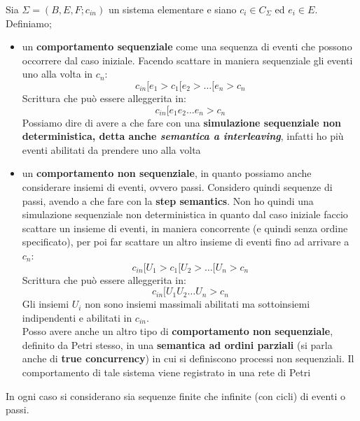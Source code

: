 \documentclass[a4paper,12pt, oneside]{book}
\begin{document}
\begin{definizione}
  Sia $\Sigma=(B,E,F;c_{in})$ un sistema elementare e siano $c_i\in C_\Sigma$ ed
  $e_i\in E$.\\
  Definiamo;
  \begin{itemize}
    \item un \textbf{comportamento sequenziale} come una sequenza di eventi che
    possono occorrere dal caso iniziale. Facendo scattare in maniera sequenziale
    gli eventi uno alla volta in $c_n$:
    \[c_{in} [e_1 > c_1 [e_2 > \ldots[e_n > c_n\]
    Scrittura che può essere alleggerita in:
    \[c_{in} [e_1 e_2 \ldots e_n > c_n\]
    Possiamo dire di avere a che fare con una \textbf{simulazione sequenziale
      non deterministica, detta anche \textit{semantica a interleaving}},
    infatti ho più eventi abilitati da prendere uno alla volta
    \item un \textbf{comportamento non sequenziale}, in quanto possiamo anche
    considerare insiemi di eventi, ovvero passi. Considero quindi sequenze di
    passi, avendo a che fare con la \textbf{step semantics}. Non ho quindi una
    simulazione sequenziale non deterministica in quanto dal caso iniziale
    faccio scattare un insieme di eventi, in maniera concorrente (e quindi senza
    ordine specificato), per poi far scattare un altro insieme di eventi fino ad
    arrivare a $c_n$: 
    \[c_{in} [U_1 > c_1 [U_2 > \ldots [U_n > c_n\]
    Scrittura che può essere alleggerita in:
    \[c_{in} [U_1 U_2 \ldots U_n > c_n\]
    Gli insiemi $U_i$ non sono insiemi massimali abilitati ma sottoinsiemi
    indipendenti e abilitati in $c_{in}$.\\
    Posso avere anche un altro tipo di \textbf{comportamento non sequenziale},
    definito da Petri stesso, in una \textbf{semantica ad ordini parziali} (si
    parla anche di \textbf{true concurrency}) in
    cui si definiscono processi non sequenziali. Il comportamento di tale
    sistema viene registrato in una rete di Petri
  \end{itemize}
  In ogni caso si considerano sia sequenze finite che infinite (con cicli) di
  eventi o passi. 
\end{definizione}
\newpage
\end{document}
